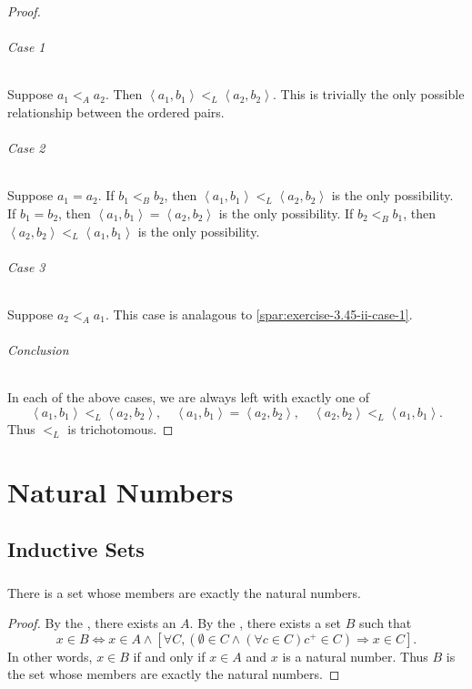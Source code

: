 \documentclass{report}
\newcommand{\pair}[1]{\left< #1 \right>}
\begin{document}
\begin{proof}
    \subparagraph{Case 1}%

      Suppose $a_1 <_A a_2$.
      Then $\pair{a_1, b_1} <_L \pair{a_2, b_2}$.
      This is trivially the only possible relationship between the ordered
        pairs.

    \subparagraph{Case 2}%

      Suppose $a_1 = a_2$.
      If $b_1 <_B b_2$, then $\pair{a_1, b_1} <_L \pair{a_2, b_2}$ is the only
        possibility.
      If $b_1 = b_2$, then $\pair{a_1, b_1} = \pair{a_2, b_2}$ is the only
        possibility.
      If $b_2 <_B b_1$, then $\pair{a_2, b_2} <_L \pair{a_1, b_1}$ is the only
        possibility.

    \subparagraph{Case 3}%

      Suppose $a_2 <_A a_1$.
      This case is analagous to \eqref{spar:exercise-3.45-ii-case-1}.

    \subparagraph{Conclusion}%

      In each of the above cases, we are always left with exactly one of
        $$\pair{a_1, b_1} <_L \pair{a_2, b_2}, \quad
          \pair{a_1, b_1} = \pair{a_2, b_2}, \quad
          \pair{a_2, b_2} <_L \pair{a_1, b_1}.$$
      Thus $<_L$ is trichotomous.

\end{proof}

\chapter{Natural Numbers}%

\section{Inductive Sets}%

\subsection{}%

\begin{theorem}[4A]

  There is a set whose members are exactly the natural numbers.

\end{theorem}

\begin{proof}

  By the , there exists an
     $A$.
  By the , there exists a set $B$ such that
    $$x \in B \iff x \in A \land \left[\forall C,
      (\emptyset \in C \land
        (\forall c \in C) c^+ \in C) \Rightarrow x \in C\right].$$
  In other words, $x \in B$ if and only if $x \in A$ and $x$ is a natural
    number.
  Thus $B$ is the set whose members are exactly the natural numbers.

\end{proof}
\end{document}

